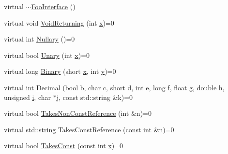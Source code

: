 \begin{DoxyCompactItemize}
virtual \mbox{\hyperlink{classtesting_1_1gmock__generated__function__mockers__test_1_1_foo_interface_ad4eb4709c9ae9b1cdaded8d05567cdbb}{$\sim$\+Foo\+Interface}} ()
\item 
virtual void \mbox{\hyperlink{classtesting_1_1gmock__generated__function__mockers__test_1_1_foo_interface_adf968115cf1260004d8abe372dc71c85}{Void\+Returning}} (int \mbox{\hyperlink{_obj__test_2lib_2googletest-master_2googlemock_2test_2gmock-matchers__test_8cc_a6150e0515f7202e2fb518f7206ed97dc}{x}})=0
\item 
virtual int \mbox{\hyperlink{classtesting_1_1gmock__generated__function__mockers__test_1_1_foo_interface_a633e753eafa7f82dde22ecf9492f341c}{Nullary}} ()=0
\item 
virtual bool \mbox{\hyperlink{classtesting_1_1gmock__generated__function__mockers__test_1_1_foo_interface_ae0885ac29bc4a3f180f6573d8b1a341e}{Unary}} (int \mbox{\hyperlink{_obj__test_2lib_2googletest-master_2googlemock_2test_2gmock-matchers__test_8cc_a6150e0515f7202e2fb518f7206ed97dc}{x}})=0
\item 
virtual long \mbox{\hyperlink{classtesting_1_1gmock__generated__function__mockers__test_1_1_foo_interface_a59ea28b711ece054ce9d57c2dc574ba0}{Binary}} (short \mbox{\hyperlink{_obj__test_2lib_2googletest-master_2googlemock_2test_2gmock-matchers__test_8cc_a6150e0515f7202e2fb518f7206ed97dc}{x}}, int \mbox{\hyperlink{_obj__test_2lib_2googletest-master_2googlemock_2test_2gmock-matchers__test_8cc_a39cb44155237f0205e0feb931d5acbed}{y}})=0
\item 
virtual int \mbox{\hyperlink{classtesting_1_1gmock__generated__function__mockers__test_1_1_foo_interface_a5a389017205848c7b7055c071cca0c6d}{Decimal}} (bool b, char c, short d, int e, long f, float g, double h, unsigned \mbox{\hyperlink{_obj__test_2lib_2googletest-master_2googlemock_2test_2gmock-matchers__test_8cc_acb559820d9ca11295b4500f179ef6392}{i}}, char $\ast$j, const std\+::string \&k)=0
\item 
virtual bool \mbox{\hyperlink{classtesting_1_1gmock__generated__function__mockers__test_1_1_foo_interface_a694354adfffcee58093298bc12182ff5}{Takes\+Non\+Const\+Reference}} (int \&n)=0
\item 
virtual std\+::string \mbox{\hyperlink{classtesting_1_1gmock__generated__function__mockers__test_1_1_foo_interface_aae85be7a3d1b53625fbeeac4694292d3}{Takes\+Const\+Reference}} (const int \&n)=0
\item 
virtual bool \mbox{\hyperlink{classtesting_1_1gmock__generated__function__mockers__test_1_1_foo_interface_a8c53e87edf0b9da878e5259f02b7f5dc}{Takes\+Const}} (const int \mbox{\hyperlink{_obj__test_2lib_2googletest-master_2googlemock_2test_2gmock-matchers__test_8cc_a6150e0515f7202e2fb518f7206ed97dc}{x}})=0

\end{DoxyCompactItemize}
